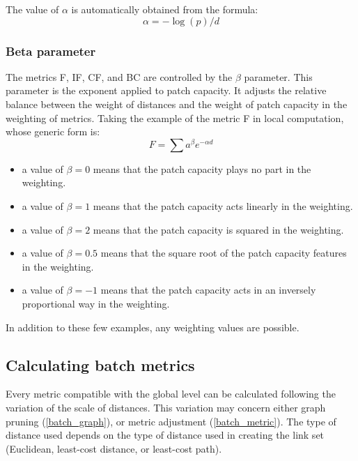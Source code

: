 \documentclass{article}
\begin{document}
The value of $\alpha$ is automatically obtained from the formula:
\begin{equation*}
\alpha =-\log \left(p\right)/{d}
\end{equation*}


\subsubsection{Beta parameter}

The metrics F, IF, CF, and BC are controlled by the $\beta$ parameter. This parameter is the exponent applied to patch capacity. It adjusts the relative balance between the weight of distances and the weight of patch capacity in the weighting of metrics. Taking the example of the metric F in local computation, whose generic form is:
\begin{equation*}
F=\sum {{a}^{\beta }}{e}^{-\mathit{\alpha d}}
\end{equation*}

\begin{itemize}
	\item a value of $\beta =0$ means that the patch capacity plays no part in the weighting.
	\item a value of $\beta =1$ means that the patch capacity acts linearly in the weighting.
	\item a value of $\beta =2$ means that the patch capacity is squared in the weighting.
	\item a value of $\beta =0.5$ means that the square root of the patch capacity features in the weighting.
	\item a value of $\beta =-1$ means that the patch capacity acts in an inversely proportional way in the weighting.	
\end{itemize}

In addition to these few examples, any weighting values are possible.

\subsection{Calculating batch metrics}

Every metric compatible with the global level can be calculated following the variation of the scale of distances. This variation may concern either graph pruning (\ref{batch_graph}), or metric adjustment (\ref{batch_metric}). The type of distance used depends on the type of distance used in creating the link set (Euclidean, least-cost distance, or least-cost path).
\end{document}
